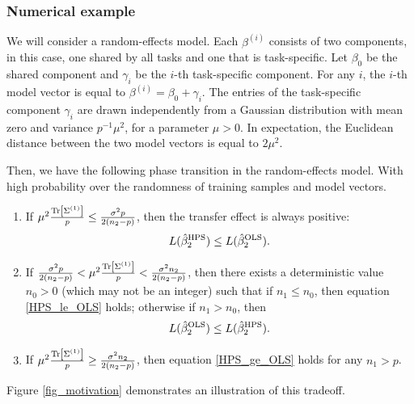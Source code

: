 \subsubsection{Numerical example}

We will consider a random-effects model.
Each $\beta^{(i)}$ consists of two components, in this case, one shared by all tasks and one that is task-specific.
Let $\beta_0$ be the shared component and $\gamma_{i}$ be the $i$-th task-specific component.
For any $i$, the $i$-th model vector is equal to
    $\beta^{(i)}=\beta_0 + \gamma_{i}.$ %
The entries of the task-specific component $\gamma_i$ are drawn independently from a Gaussian distribution with mean zero and variance $p^{-1}\mu^2$, for a parameter $\mu > 0$.
In expectation, the Euclidean distance between the two model vectors is equal to $2\mu^2$.

Then, we have the following phase transition in the random-effects model.
With high probability over the randomness of training samples and model vectors.
\begin{enumerate}%
    \item If $ {\mu^2} \frac {\operatorname{Tr}\left[\Sigma^{(1)}\right]}{p} \le \frac{\sigma^2 p}{2(n_2 - p)}$, then the transfer effect is always positive:
        \begin{align}\label{HPS_le_OLS}
        L(\hat{\beta}_2^{\MTL}) \le L(\hat{\beta}_2^{\STL}) . %
        \end{align}
    \item If $\frac{\sigma^2 p}{2(n_2 - p)} < {\mu^2} \frac{\operatorname{Tr}\left[\Sigma^{(1)}\right]}{p} < \frac{\sigma^2 n_2}{2(n_2 - p)}$, then there exists a deterministic value $n_0>0$ (which may not be an integer) such that if $n_1  \le n_0$, then equation \eqref{HPS_le_OLS} holds;
        otherwise if $n_1  > n_0$, then
        \begin{align}\label{HPS_ge_OLS}
        L(\hat{\beta}_2^{\STL}) \le L(\hat{\beta}_2^{\MTL}). %
        \end{align}
    \item If ${\mu^2} \frac{\operatorname{Tr}\left[\Sigma^{(1)}\right]}{p} \ge \frac{\sigma^2 n_2} {2(n_2 - p)}$, then equation \eqref{HPS_ge_OLS} holds for any $n_1 > p$. %
\end{enumerate}
Figure \ref{fig_motivation} demonstrates an illustration of this tradeoff.

